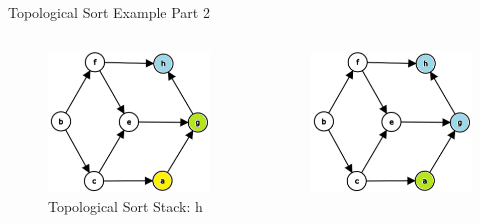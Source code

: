 \documentclass[aspectratio=169]{beamer}%
\begin{document}
\begin{frame}{Topological Sort Example Part 2}
    \begin{columns}
        \begin{column}{.32\textwidth}
            \begin{figure}
                \centering
                \includegraphics[width = .9\linewidth]{topsort4.png}
                \caption{Topological Sort Stack: h}
            \end{figure}
        \end{column}
        \hfill
        \begin{column}{.32\textwidth}
            \begin{figure}
                \centering
                \includegraphics[width = .9\linewidth]{topsort5.png}

\end{figure}
\end{column}
\end{columns}
\end{frame}
\end{document}
